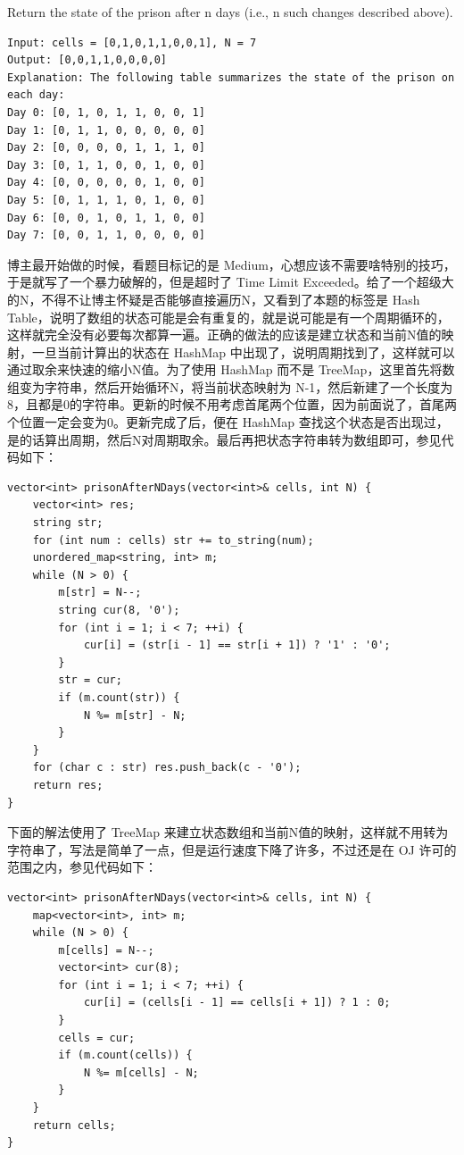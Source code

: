 \documentclass[9pt, b5paaper]{book}
\begin{document}
Return the state of the prison after n days (i.e., n such changes described above).
\begin{verbatim}
Input: cells = [0,1,0,1,1,0,0,1], N = 7
Output: [0,0,1,1,0,0,0,0]
Explanation: The following table summarizes the state of the prison on each day:
Day 0: [0, 1, 0, 1, 1, 0, 0, 1]
Day 1: [0, 1, 1, 0, 0, 0, 0, 0]
Day 2: [0, 0, 0, 0, 1, 1, 1, 0]
Day 3: [0, 1, 1, 0, 0, 1, 0, 0]
Day 4: [0, 0, 0, 0, 0, 1, 0, 0]
Day 5: [0, 1, 1, 1, 0, 1, 0, 0]
Day 6: [0, 0, 1, 0, 1, 1, 0, 0]
Day 7: [0, 0, 1, 1, 0, 0, 0, 0]
\end{verbatim}
博主最开始做的时候，看题目标记的是 Medium，心想应该不需要啥特别的技巧，于是就写了一个暴力破解的，但是超时了 Time Limit Exceeded。给了一个超级大的N，不得不让博主怀疑是否能够直接遍历N，又看到了本题的标签是 Hash Table，说明了数组的状态可能是会有重复的，就是说可能是有一个周期循环的，这样就完全没有必要每次都算一遍。正确的做法的应该是建立状态和当前N值的映射，一旦当前计算出的状态在 HashMap 中出现了，说明周期找到了，这样就可以通过取余来快速的缩小N值。为了使用 HashMap 而不是 TreeMap，这里首先将数组变为字符串，然后开始循环N，将当前状态映射为 N-1，然后新建了一个长度为8，且都是0的字符串。更新的时候不用考虑首尾两个位置，因为前面说了，首尾两个位置一定会变为0。更新完成了后，便在 HashMap 查找这个状态是否出现过，是的话算出周期，然后N对周期取余。最后再把状态字符串转为数组即可，参见代码如下：
\begin{verbatim}
vector<int> prisonAfterNDays(vector<int>& cells, int N) {
    vector<int> res;
    string str;
    for (int num : cells) str += to_string(num);
    unordered_map<string, int> m;
    while (N > 0) {
        m[str] = N--;
        string cur(8, '0');
        for (int i = 1; i < 7; ++i) {
            cur[i] = (str[i - 1] == str[i + 1]) ? '1' : '0';
        }
        str = cur;
        if (m.count(str)) {
            N %= m[str] - N;
        }
    }
    for (char c : str) res.push_back(c - '0');
    return res;
}
\end{verbatim}
下面的解法使用了 TreeMap 来建立状态数组和当前N值的映射，这样就不用转为字符串了，写法是简单了一点，但是运行速度下降了许多，不过还是在 OJ 许可的范围之内，参见代码如下：
\begin{verbatim}
vector<int> prisonAfterNDays(vector<int>& cells, int N) {
    map<vector<int>, int> m;
    while (N > 0) {
        m[cells] = N--;
        vector<int> cur(8);
        for (int i = 1; i < 7; ++i) {
            cur[i] = (cells[i - 1] == cells[i + 1]) ? 1 : 0;
        }
        cells = cur;
        if (m.count(cells)) {
            N %= m[cells] - N;
        }
    }
    return cells;
}
\end{verbatim}
\end{document}
